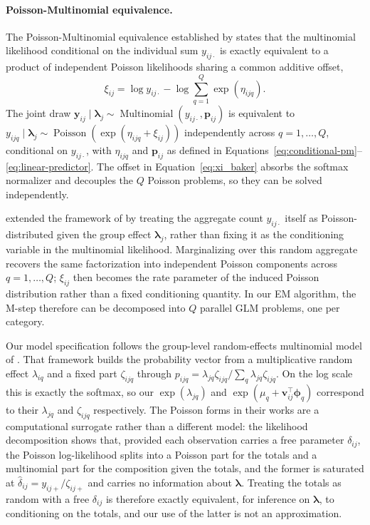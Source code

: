 \paragraph{Poisson-Multinomial equivalence.}
\label{sec:PME}
The Poisson-Multinomial equivalence established by \citet{Baker1994} states that the multinomial likelihood conditional on the individual sum $y_{ij\cdot}$ is exactly equivalent to a product of independent Poisson likelihoods sharing a common additive offset,
\begin{equation}
\xi_{ij}=\log y_{ij\cdot}-\log\sum_{q=1}^Q\exp(\eta_{ijq}).
\label{eq:xi_baker}
\end{equation}
The joint draw $\bm{y}_{ij}\mid\bm\lambda_j\sim\operatorname{Multinomial}(y_{ij\cdot},\bm{p}_{ij})$ is equivalent to $y_{ijq}\mid\bm\lambda_j\sim\operatorname{Poisson}(\exp(\eta_{ijq}+\xi_{ij}))$ independently across $q=1,\dots,Q$, conditional on $y_{ij\cdot}$, with $\eta_{ijq}$ and $\bm{p}_{ij}$ as defined in Equations~\eqref{eq:conditional-pm}--\eqref{eq:linear-predictor}. The offset in Equation~\eqref{eq:xi_baker} absorbs the softmax normalizer and decouples the $Q$ Poisson problems, so they can be solved independently.

\citet{Lee2017} extended the framework of \citet{Baker1994} by treating the aggregate count $y_{ij\cdot}$ itself as Poisson-distributed given the group effect $\bm\lambda_j$, rather than fixing it as the conditioning variable in the multinomial likelihood. Marginalizing over this random aggregate recovers the same factorization into independent Poisson components across $q=1,\dots,Q$; $\xi_{ij}$ then becomes the rate parameter of the induced Poisson distribution rather than a fixed conditioning quantity. In our EM algorithm, the M-step therefore can be decomposed into $Q$ parallel GLM problems, one per category.

Our model specification follows the group-level random-effects multinomial model of \citet{Lee2017}. That framework builds the probability vector from a multiplicative random effect $\lambda_{iq}$ and a fixed part $\zeta_{ijq}$ through $p_{ijq}=\lambda_{jq}\zeta_{ijq}/\sum_q\lambda_{jq}\zeta_{ijq}$. On the log scale this is exactly the softmax, so our $\exp(\lambda_{jq})$ and $\exp(\mu_q+\bm{v}_{ij}^\top\bm\phi_q)$ correspond to their $\lambda_{jq}$ and $\zeta_{ijq}$ respectively. The Poisson forms in their works are a computational surrogate rather than a different model: the likelihood decomposition shows that, provided each observation carries a free parameter $\delta_{ij}$, the Poisson log-likelihood splits into a Poisson part for the totals and a multinomial part for the composition given the totals, and  the former is saturated at $\hat\delta_{ij}=y_{ij+}/\zeta_{ij+}$ and carries no information about $\bm\lambda$. Treating the totals as random with a free $\delta_{ij}$ is therefore exactly equivalent, for inference on $\bm\lambda$, to conditioning on the totals, and our use of the latter is not an approximation.

